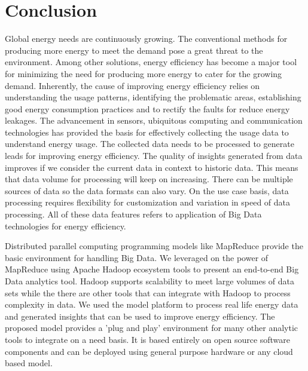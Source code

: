 \chapter{Conclusion}
\label{chapter:concluion}

Global energy needs are continuously growing. The conventional methods for producing more energy to meet the demand pose a great threat to the environment. Among other solutions, energy efficiency has become a major tool for minimizing the need for producing more energy to cater for the growing demand. Inherently, the cause of improving energy efficiency relies on understanding the usage patterns, identifying the problematic areas, establishing good energy consumption practices and to rectify the faults for reduce energy leakages. The advancement in sensors, ubiquitous computing  and communication technologies has provided the basis for effectively collecting the usage data to understand energy usage. The collected data needs to be processed to generate leads for improving energy efficiency. The quality of insights generated from data improves if we consider the current data in context to historic data. This means that data volume for processing will keep on increasing. There can be multiple sources of data so the data formats can also vary. On the use case basis, data processing requires flexibility for customization and variation in speed of data processing. All of these data features refers to application of Big Data technologies for energy efficiency. 

Distributed parallel computing programming models like MapReduce provide the basic environment for handling Big Data. We leveraged on the power of MapReduce using Apache Hadoop ecosystem tools to present an end-to-end Big Data analytics tool. Hadoop supports scalability to meet large volumes of data sets while the there are other tools that can integrate with Hadoop to process complexity in data. We used the model platform to process real life energy data and generated insights that can be used to improve energy efficiency. The proposed model provides a 'plug and play' environment for many other analytic tools to integrate on a need basis. It is based entirely on open source software components and can be deployed using general purpose hardware or any cloud based model.

